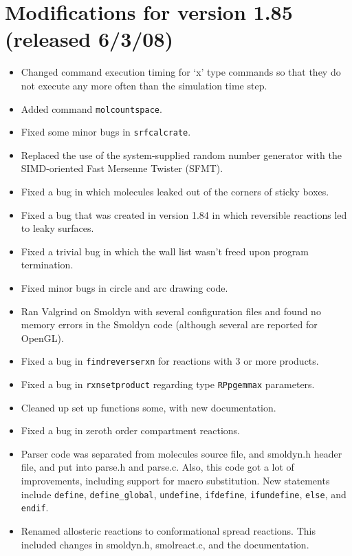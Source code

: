 \documentclass {scrbook}
\newcommand {\ttt} {\texttt}
\begin{document}
\section{Modifications for version 1.85 (released 6/3/08)}
\begin{itemize}
\item Changed command execution timing for `x' type commands so that they do not execute any more often than the simulation time step.
\item Added command \ttt{molcountspace}.
\item Fixed some minor bugs in \ttt{srfcalcrate}.
\item Replaced the use of the system-supplied random number generator with the SIMD-oriented Fast Mersenne Twister (SFMT).
\item Fixed a bug in which molecules leaked out of the corners of sticky boxes.
\item Fixed a bug that was created in version 1.84 in which reversible reactions led to leaky surfaces.
\item Fixed a trivial bug in which the wall list wasn't freed upon program termination.
\item Fixed minor bugs in circle and arc drawing code.
\item Ran Valgrind on Smoldyn with several configuration files and found no memory errors in the Smoldyn code (although several are reported for OpenGL).
\item Fixed a bug in \ttt{findreverserxn} for reactions with 3 or more products.
\item Fixed a bug in \ttt{rxnsetproduct} regarding type \ttt{RPpgemmax} parameters.
\item Cleaned up set up functions some, with new documentation.
\item Fixed a bug in zeroth order compartment reactions.
\item Parser code was separated from molecules source file, and smoldyn.h header file, and put into parse.h and parse.c. Also, this code got a lot of improvements, including support for macro substitution. New statements include \ttt{define}, \ttt{define\_global}, \ttt{undefine}, \ttt{ifdefine}, \ttt{ifundefine}, \ttt{else}, and \ttt{endif}.
\item Renamed allosteric reactions to conformational spread reactions. This included changes in smoldyn.h, smolreact.c, and the documentation.
\end{itemize}
\end{document}
